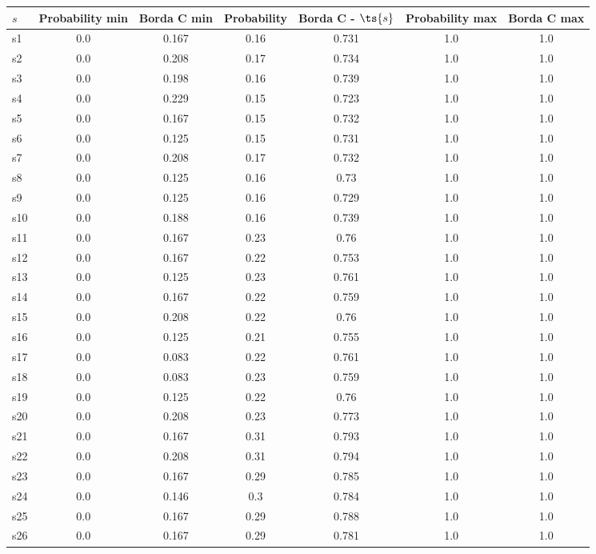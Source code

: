 \documentclass{article}
\begin{document}
\noindent\begin{tabular}{|l|c|c|c|c|c|c|}
\hline
$s$& Probability min & Borda C min & Probability & Borda C - $\ts{s}$ & Probability max & Borda C max\\
\hline
s1 &0.0 & 0.167 & 0.16 & 0.731 & 1.0 & 1.0\\
\hline
s2 &0.0 & 0.208 & 0.17 & 0.734 & 1.0 & 1.0\\
\hline
s3 &0.0 & 0.198 & 0.16 & 0.739 & 1.0 & 1.0\\
\hline
s4 &0.0 & 0.229 & 0.15 & 0.723 & 1.0 & 1.0\\
\hline
s5 &0.0 & 0.167 & 0.15 & 0.732 & 1.0 & 1.0\\
\hline
s6 &0.0 & 0.125 & 0.15 & 0.731 & 1.0 & 1.0\\
\hline
s7 &0.0 & 0.208 & 0.17 & 0.732 & 1.0 & 1.0\\
\hline
s8 &0.0 & 0.125 & 0.16 & 0.73 & 1.0 & 1.0\\
\hline
s9 &0.0 & 0.125 & 0.16 & 0.729 & 1.0 & 1.0\\
\hline
s10 &0.0 & 0.188 & 0.16 & 0.739 & 1.0 & 1.0\\
\hline
s11 &0.0 & 0.167 & 0.23 & 0.76 & 1.0 & 1.0\\
\hline
s12 &0.0 & 0.167 & 0.22 & 0.753 & 1.0 & 1.0\\
\hline
s13 &0.0 & 0.125 & 0.23 & 0.761 & 1.0 & 1.0\\
\hline
s14 &0.0 & 0.167 & 0.22 & 0.759 & 1.0 & 1.0\\
\hline
s15 &0.0 & 0.208 & 0.22 & 0.76 & 1.0 & 1.0\\
\hline
s16 &0.0 & 0.125 & 0.21 & 0.755 & 1.0 & 1.0\\
\hline
s17 &0.0 & 0.083 & 0.22 & 0.761 & 1.0 & 1.0\\
\hline
s18 &0.0 & 0.083 & 0.23 & 0.759 & 1.0 & 1.0\\
\hline
s19 &0.0 & 0.125 & 0.22 & 0.76 & 1.0 & 1.0\\
\hline
s20 &0.0 & 0.208 & 0.23 & 0.773 & 1.0 & 1.0\\
\hline
s21 &0.0 & 0.167 & 0.31 & 0.793 & 1.0 & 1.0\\
\hline
s22 &0.0 & 0.208 & 0.31 & 0.794 & 1.0 & 1.0\\
\hline
s23 &0.0 & 0.167 & 0.29 & 0.785 & 1.0 & 1.0\\
\hline
s24 &0.0 & 0.146 & 0.3 & 0.784 & 1.0 & 1.0\\
\hline
s25 &0.0 & 0.167 & 0.29 & 0.788 & 1.0 & 1.0\\
\hline
s26 &0.0 & 0.167 & 0.29 & 0.781 & 1.0 & 1.0\\

\end{tabular}
\end{document}

